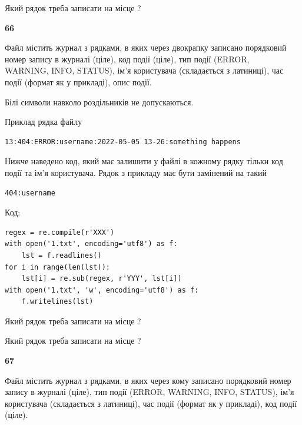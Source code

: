 Який рядок треба записати на місце  ?\par


\newpage

{\begin {center}\textbf{ 66}\end {center}}\par
Файл  містить журнал з рядками, в яких через двокрапку записано поряд\-ко\-вий номер запису в журналі (ціле), код події (ціле), тип події (ERROR, \\WARNING, INFO, STATUS), ім'я користувача (складається з латиниці), час події (фор\-мат як у прикладі), опис події.

Білі символи навколо роздільників не допускаються.

Приклад рядка файлу



\begin{verbatim}
13:404:ERROR:username:2022-05-05 13-26:something happens
\end{verbatim}


Нижче наведено код, який має залишити у файлі в кожному рядку тільки код події та ім'я користувача. Рядок з прикладу має бути замінений на такий



\begin{verbatim}
404:username
\end{verbatim}




Код:



\begin{verbatim}
regex = re.compile(r'XXX')
with open('1.txt', encoding='utf8') as f:
    lst = f.readlines()
for i in range(len(lst)):
    lst[i] = re.sub(regex, r'YYY', lst[i])
with open('1.txt', 'w', encoding='utf8') as f:
    f.writelines(lst)
\end{verbatim}







Який рядок треба записати на місце  ?\par
\vspace{5mm}


Який рядок треба записати на місце  ?\par


\newpage

{\begin {center}\textbf{ 67}\end {center}}\par
Файл  містить журнал з рядками, в яких через кому записано поряд\-ко\-вий номер запису в журналі (ціле), тип події (ERROR, WARNING, INFO, STATUS), ім'я користувача (складається з латиниці), час події (фор\-мат як у прикладі), код події (ціле).

